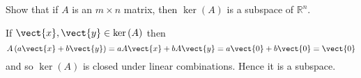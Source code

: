 \begin{enumialphparenastyle}
\begin{ex} Show that if $A$ is an $m\times n$ matrix, then $\ker \left( A\right) $
is a subspace of $\mathbb{R}^n$.
\begin{sol}
If $\vect{x},\vect{y}\in \ker \left( A\right) $ then
\[
A\left( a\vect{x}+b\vect{y}\right) =aA\vect{x}+bA\vect{y}=a\vect{0}
+b\vect{0}=\vect{0}
\]
and so $\ker \left( A\right) $ is closed under linear combinations. Hence it
is a subspace.
\end{sol}
\end{ex}

\end{enumialphparenastyle}